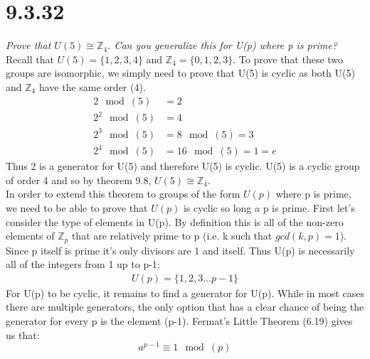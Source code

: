 \documentclass[a4paper, 11pt]{article}
\begin{document}
\section*{9.3.32}
\textit{Prove that $U(5)\cong \mathbb{Z}_4$. Can you generalize this for U(p) where p is prime?}\\

\noindent Recall that $U(5) = \{1,2,3,4\}$ and $\mathbb{Z}_4 = \{0,1,2,3\}$. To prove that these two groups are isomorphic, we simply need to prove that U(5) is cyclic as both U(5) and $\mathbb{Z}_4$ have the same order (4).  
	\begin{align*}
		2 \mod(5) &= 2 \\ 
		2^2 \mod(5) &=  4 \\ 
		2^3 \mod(5) &= 8 \mod(5) = 3 \\ 
		2^4 \mod(5) &= 16 \mod(5) = 1 = e 
	\end{align*}
Thus 2 is a generator for U(5) and therefore U(5) is cyclic. U(5) is a cyclic group of order 4 and so by theorem 9.8, $U(5) \cong \mathbb{Z}_4$. \\ 

\noindent In order to extend this theorem to groups of the form $U(p)$ where p is prime, we need to be able to prove that $U(p)$ is cyclic so long a p is prime. First let's consider the type of elements in U(p). By definition this is all of the non-zero elements of $\mathbb{Z}_p$ that are relatively prime to p (i.e. k such that $gcd(k,p)=1$). Since p itself is prime it's only divisors are 1 and itself. Thus U(p) is necessarily all of the integers from 1 up to p-1: 
	\begin{align}
		U(p) = \{1,2,3...p-1\}
	\end{align}
For U(p) to be cyclic, it remains to find a generator for U(p). While in most cases there are multiple generators, the only option that has a clear chance of being the generator for every p is the element (p-1). Fermat's Little Theorem (6.19) gives us that: 
	\begin{equation}
		a^{p-1} \equiv 1 \mod(p) 
	\end{equation}
\end{document}
